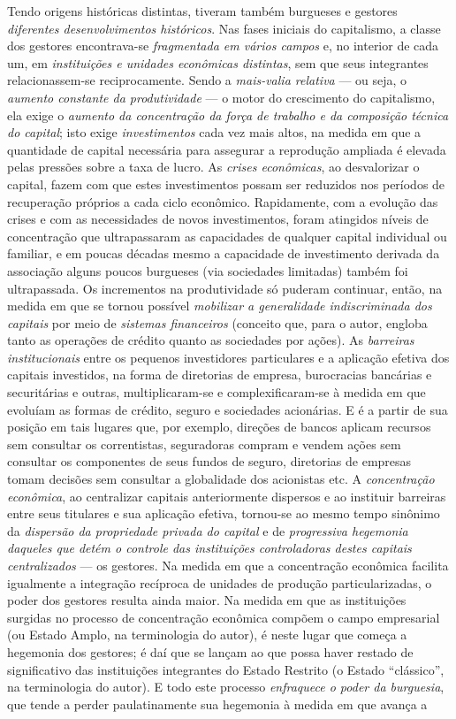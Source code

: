 Tendo origens históricas distintas, tiveram também burgueses e gestores \textit{diferentes desenvolvimentos históricos}. Nas fases iniciais do capitalismo, a classe dos gestores encontrava-se \textit{fragmentada em vários campos} e, no interior de cada um, em \textit{instituições e unidades econômicas distintas}, sem que seus integrantes relacionassem-se reciprocamente. Sendo a \textit{mais-valia relativa} --- ou seja, o \textit{aumento constante da produtividade} --- o motor do crescimento do capitalismo, ela exige o \textit{aumento da concentração da força de trabalho e da composição técnica do capital}; isto exige \textit{investimentos} cada vez mais altos, na medida em que a quantidade de capital necessária para assegurar a reprodução ampliada é elevada pelas pressões sobre a taxa de lucro. As \textit{crises econômicas}, ao desvalorizar o capital, fazem com que estes investimentos possam ser reduzidos nos períodos de recuperação próprios a cada ciclo econômico. Rapidamente, com a evolução das crises e com as necessidades de novos investimentos, foram atingidos níveis de concentração que ultrapassaram as capacidades de qualquer capital individual ou familiar, e em poucas décadas mesmo a capacidade de investimento derivada da associação alguns poucos burgueses (via sociedades limitadas) também foi ultrapassada. Os incrementos na produtividade só puderam continuar, então, na medida em que se tornou possível \textit{mobilizar a generalidade indiscriminada dos capitais} por meio de \textit{sistemas financeiros} (conceito que, para o autor, engloba tanto as operações de crédito quanto as sociedades por ações). As \textit{barreiras institucionais} entre os pequenos investidores particulares e a aplicação efetiva dos capitais investidos, na forma de diretorias de empresa, burocracias bancárias e securitárias e outras, multiplicaram-se e complexificaram-se à medida em que evoluíam as formas de crédito, seguro e sociedades acionárias. E é a partir de sua posição em tais lugares que, por exemplo, direções de bancos aplicam recursos sem consultar os correntistas, seguradoras compram e vendem ações sem consultar os componentes de seus fundos de seguro, diretorias de empresas tomam decisões sem consultar a globalidade dos acionistas etc. A \textit{concentração econômica}, ao centralizar capitais anteriormente dispersos e ao instituir barreiras entre seus titulares e sua aplicação efetiva, tornou-se ao mesmo tempo sinônimo da \textit{dispersão da propriedade privada do capital} e de \textit{progressiva hegemonia daqueles que detém o controle das instituições controladoras destes capitais centralizados} --- os gestores. Na medida em que a concentração econômica facilita igualmente a integração recíproca de unidades de produção particularizadas, o poder dos gestores resulta ainda maior. Na medida em que as instituições surgidas no processo de concentração econômica compõem o campo empresarial (ou Estado Amplo, na terminologia do autor), é neste lugar que começa a hegemonia dos gestores; é daí que se lançam ao que possa haver restado de significativo das instituições integrantes do Estado Restrito (o Estado ``clássico'', na terminologia do autor). E todo este processo \textit{enfraquece o poder da burguesia}, que tende a perder paulatinamente sua hegemonia à medida em que avança a 